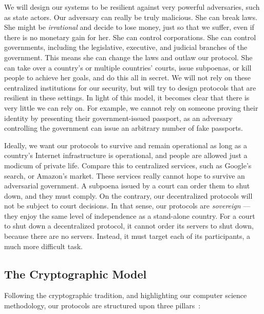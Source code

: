 We will design our systems to be resilient against very powerful adversaries, such as state
actors. Our adversary can really be truly malicious. She can break laws. She might be \emph{irrational}
and decide to lose money, just so that we suffer, even if there is no monetary gain for her.
She can control corporations. She can control governments, including the legislative, executive,
and judicial branches of the government. This means she can change the laws and outlaw our protocol.
She can take over a country's or multiple countries'
courts, issue subpoenas, or kill people to achieve her goals, and do this all in secret.
We will not rely on these centralized institutions
for our security, but will try to design protocols that are resilient in these settings.
In light of this model, it becomes clear that there is very little we can rely
on. For example, we cannot rely on someone proving their identity by presenting their government-issued
passport, as an adversary controlling the government can issue an arbitrary number of fake
passports.

Ideally, we want our protocols to survive and remain operational as long as a country's Internet
infrastructure is operational, and people are allowed just a modicum of private life. Compare this
to centralized services, such as Google's search, or Amazon's market. These services really cannot
hope to survive an adversarial government. A subpoena issued by a court can order them to shut
down, and they must comply. On the contrary, our decentralized protocols will not be subject to
court decisions. In that sense, our protocols are \emph{sovereign} --- they enjoy the same level
of independence as a stand-alone country. For a court to shut down a decentralized protocol, it
cannot order its servers to shut down, because there are no servers. Instead, it must target
each of its participants, a much more difficult task.

\subsection*{The Cryptographic Model}

Following the cryptographic tradition, and highlighting our computer science methodology,
our protocols are structured upon three pillars~\cite{katz}:

